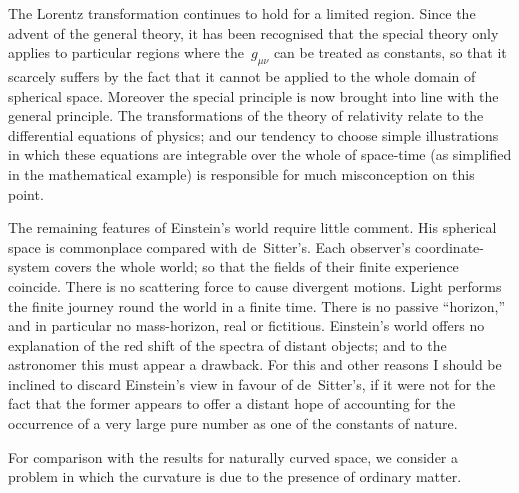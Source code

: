 \documentclass[12pt]{book}
\begin{document}
The Lorentz transformation continues to hold for a limited region. Since
the advent of the general theory, it has been recognised that the special theory
only applies to particular regions where the~$g_{\mu\nu}$ can be treated as constants, so
that it scarcely suffers by the fact that it cannot be applied to the whole
domain of spherical space. Moreover the special principle is now brought into
line with the general principle. The transformations of the theory of relativity
relate to the differential equations of physics; and our tendency to choose
simple illustrations in which these equations are integrable over the whole of
space-time (as simplified in the mathematical example) is responsible for much
misconception on this point.

The remaining features of Einstein's world require little comment. His
spherical space is commonplace compared with de~Sitter's. Each observer's
coordinate-system covers the whole world; so that the fields of their finite
experience coincide. There is no scattering force to cause divergent motions.
Light performs the finite journey round the world in a finite time. There is
no passive ``horizon,'' and in particular no mass-horizon, real or fictitious.
Einstein's world offers no explanation of the red shift of the spectra of distant
objects; and to the astronomer this must appear a drawback. For this and
other reasons I should be inclined to discard Einstein's view in favour of
de~Sitter's, if it were not for the fact that the former appears to offer a distant
hope of accounting for the occurrence of a very large pure number as one of
the constants of nature.

%
%
%

For comparison with the results for naturally curved space, we consider a
problem in which the curvature is due to the presence of ordinary matter.
\end{document}
